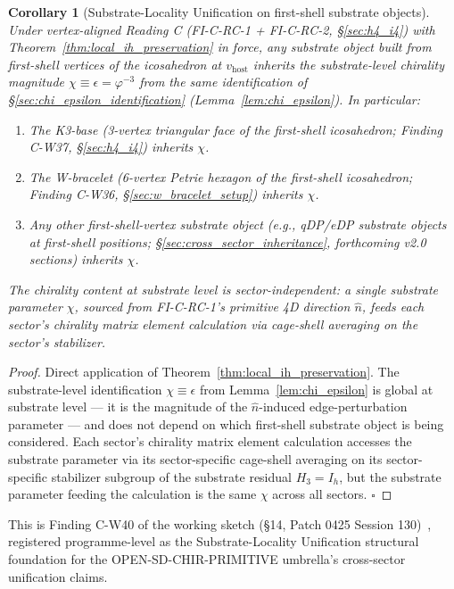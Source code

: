 \documentclass[11pt,letterpaper]{article}
\newtheorem{corollary}[theorem]{Corollary}
\newcommand{\phig}{\varphi}
\begin{document}
\begin{corollary}[Substrate-Locality Unification on first-shell substrate objects]\label{cor:substrate_locality_unification}
Under vertex-aligned Reading C (FI-C-RC-1 + FI-C-RC-2, \S\ref{sec:h4_i4}) with Theorem~\ref{thm:local_ih_preservation} in force, any substrate object built from first-shell vertices of the icosahedron at $v_{\text{host}}$ inherits the substrate-level chirality magnitude $\chi \equiv \epsilon = \phig^{-3}$ from the same identification of \S\ref{sec:chi_epsilon_identification} (Lemma~\ref{lem:chi_epsilon}). In particular:
\begin{enumerate}\setlength\itemsep{0.2em}
    \item The K3-base (3-vertex triangular face of the first-shell icosahedron; Finding C-W37, \S\ref{sec:h4_i4}) inherits $\chi$.
    \item The W-bracelet (6-vertex Petrie hexagon of the first-shell icosahedron; Finding C-W36, \S\ref{sec:w_bracelet_setup}) inherits $\chi$.
    \item Any other first-shell-vertex substrate object (e.g., qDP/eDP substrate objects at first-shell positions; \S\ref{sec:cross_sector_inheritance}, forthcoming v2.0 sections) inherits $\chi$.
\end{enumerate}
The chirality content at substrate level is sector-independent: a single substrate parameter $\chi$, sourced from FI-C-RC-1's primitive 4D direction $\hat{n}$, feeds each sector's chirality matrix element calculation via cage-shell averaging on the sector's stabilizer.
\end{corollary}

\begin{proof}
Direct application of Theorem~\ref{thm:local_ih_preservation}. The substrate-level identification $\chi \equiv \epsilon$ from Lemma~\ref{lem:chi_epsilon} is global at substrate level --- it is the magnitude of the $\hat{n}$-induced edge-perturbation parameter --- and does not depend on which first-shell substrate object is being considered. Each sector's chirality matrix element calculation accesses the substrate parameter via its sector-specific cage-shell averaging on its sector-specific stabilizer subgroup of the substrate residual $H_3 = I_h$, but the substrate parameter feeding the calculation is the same $\chi$ across all sectors. $\square$
\end{proof}

This is Finding C-W40 of the working sketch (\S14, Patch 0425 Session 130)~\cite{abshier_capotauro_chiral_mechanism_sketch}, registered programme-level as the Substrate-Locality Unification structural foundation for the OPEN-SD-CHIR-PRIMITIVE umbrella's cross-sector unification claims.
\end{document}
